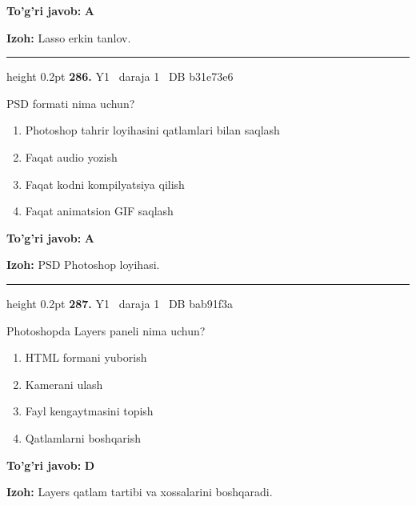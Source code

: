 \documentclass[10pt,a4paper,oneside]{article}
\begin{document}
\begin{tcolorbox}[enhanced,breakable,colback=teal!4,colframe=teal!45!black,boxrule=0.45pt,arc=1.2mm,left=2.8mm,right=2.8mm,top=2mm,bottom=2mm,before skip=2mm,after skip=2mm]
\textbf{\color{teal}To'g'ri javob:} \textbf{A}
\par\smallskip
\textbf{Izoh:} Lasso erkin tanlov.
\end{tcolorbox}
\vspace{2mm}\hrule height 0.2pt \vspace{4mm}
\hypertarget{q286}{\textbf{\color{ink}286.}}  {\color{muted}\scriptsize Y1 \textbullet\ daraja 1 \textbullet\ DB b31e73e6}
\par
PSD formati nima uchun?
\begin{enumerate}[label=\Alph*),leftmargin=9mm]
\item Photoshop tahrir loyihasini qatlamlari bilan saqlash
\item Faqat audio yozish
\item Faqat kodni kompilyatsiya qilish
\item Faqat animatsion GIF saqlash
\end{enumerate}
\begin{tcolorbox}[enhanced,breakable,colback=teal!4,colframe=teal!45!black,boxrule=0.45pt,arc=1.2mm,left=2.8mm,right=2.8mm,top=2mm,bottom=2mm,before skip=2mm,after skip=2mm]
\textbf{\color{teal}To'g'ri javob:} \textbf{A}
\par\smallskip
\textbf{Izoh:} PSD Photoshop loyihasi.
\end{tcolorbox}
\vspace{2mm}\hrule height 0.2pt \vspace{4mm}
\hypertarget{q287}{\textbf{\color{ink}287.}}  {\color{muted}\scriptsize Y1 \textbullet\ daraja 1 \textbullet\ DB bab91f3a}
\par
Photoshopda Layers paneli nima uchun?
\begin{enumerate}[label=\Alph*),leftmargin=9mm]
\item HTML formani yuborish
\item Kamerani ulash
\item Fayl kengaytmasini topish
\item Qatlamlarni boshqarish
\end{enumerate}
\begin{tcolorbox}[enhanced,breakable,colback=teal!4,colframe=teal!45!black,boxrule=0.45pt,arc=1.2mm,left=2.8mm,right=2.8mm,top=2mm,bottom=2mm,before skip=2mm,after skip=2mm]
\textbf{\color{teal}To'g'ri javob:} \textbf{D}
\par\smallskip
\textbf{Izoh:} Layers qatlam tartibi va xossalarini boshqaradi.
\end{tcolorbox}
\end{document}
